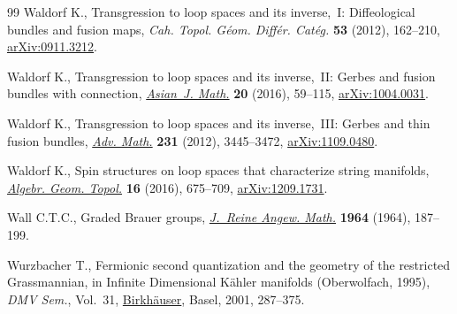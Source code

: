 \documentclass[10pt,a4paper]{amsart}
\providecommand{\LastPageEnding}{}
\numberwithin{equation}{section}
\begin{document}
\begin{thebibliography}{99}
Waldorf K., Transgression to loop spaces and its inverse,~{I}: {D}iffeological
 bundles and fusion maps, \textit{Cah. Topol. G\'eom. Diff\'er. Cat\'eg.}
 \textbf{53} (2012), 162--210, \href{https://arxiv.org/abs/0911.3212}{arXiv:0911.3212}.

Waldorf K., Transgression to loop spaces and its inverse,~{II}: {G}erbes and
 fusion bundles with connection, \href{https://doi.org/10.4310/AJM.2016.v20.n1.a4}{\textit{Asian~J. Math.}} \textbf{20} (2016),
 59--115, \href{https://arxiv.org/abs/1004.0031}{arXiv:1004.0031}.

Waldorf K., Transgression to loop spaces and its inverse,~{III}: {G}erbes and
 thin fusion bundles,  \href{https://doi.org/10.1016/j.aim.2012.08.016}{\textit{Adv. Math.}} \textbf{231} (2012), 3445--3472,
 \href{https://arxiv.org/abs/1109.0480}{arXiv:1109.0480}.

Waldorf K., Spin structures on loop spaces that characterize string manifolds,
 \href{https://doi.org/10.2140/agt.2016.16.675}{\textit{Algebr. Geom. Topol.}} \textbf{16} (2016), 675--709,
 \href{https://arxiv.org/abs/1209.1731}{arXiv:1209.1731}.

Wall C.T.C., Graded {B}rauer groups, \href{https://doi.org/10.1515/crll.1964.213.187}{\textit{J.~Reine Angew. Math.}}
 \textbf{1964} (1964), 187--199.

Wurzbacher T., Fermionic second quantization and the geometry of the restricted
 {G}rassmannian, in Infinite {D}imensional {K}\"ahler manifolds
 ({O}berwolfach, 1995), \textit{DMV Sem.}, Vol.~31, \href{https://doi.org/10.1007/978-3-0348-8227-9_6}{Birkh\"auser}, Basel, 2001,
 287--375.

\end{thebibliography}\LastPageEnding
\end{document}
